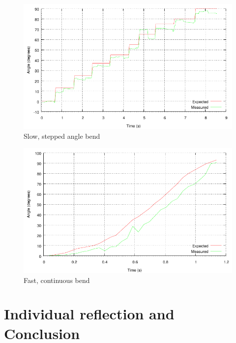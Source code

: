 \documentclass[a4paper, 12pt]{article}
\begin{document}
\begin{figure}[H]
    \centering
    \includegraphics[scale=1.15]{stepped.pdf}
    \caption{Slow, stepped angle bend}
    \label{fig:pic8}
\end{figure}

\begin{figure}[H]
    \centering
    \includegraphics[scale=1.15]{fast_continuous.pdf}
    \caption{Fast, continuous bend}
    \label{fig:pic9}
\end{figure}

\section*{Individual reflection and Conclusion}


\end{document}
